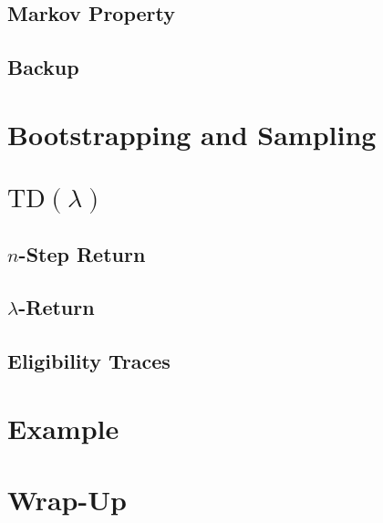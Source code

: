         \subsection{Markov Property} %

        \subsection{Backup} %

    \section{Bootstrapping and Sampling} %

    \section{\( \text{TD}(\lambda) \)} %

        \subsection{\(n\)-Step Return} %

        \subsection{\(\lambda\)-Return} %

        \subsection{Eligibility Traces} %

    \section{Example} %

    \section{Wrap-Up} %

